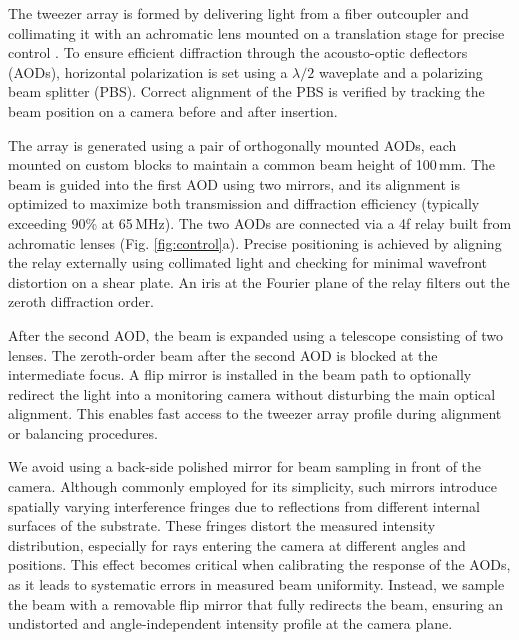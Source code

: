 The tweezer array is formed by delivering light from a fiber outcoupler and collimating it with an achromatic lens mounted on a translation stage for precise control \cite{culemann_construction_2024}. To ensure efficient diffraction through the acousto-optic deflectors (AODs), horizontal polarization is set using a $\lambda/2$ waveplate and a polarizing beam splitter (PBS). Correct alignment of the PBS is verified by tracking the beam position on a camera before and after insertion.

The array is generated using a pair of orthogonally mounted AODs, each mounted on custom blocks to maintain a common beam height of 100\,mm. The beam is guided into the first AOD using two mirrors, and its alignment is optimized to maximize both transmission and diffraction efficiency (typically exceeding 90\% at 65\,MHz). The two AODs are connected via a 4f relay built from achromatic lenses (Fig. \ref{fig:control}a). Precise positioning is achieved by aligning the relay externally using collimated light and checking for minimal wavefront distortion on a shear plate. An iris at the Fourier plane of the relay filters out the zeroth diffraction order.

After the second AOD, the beam is expanded using a telescope consisting of two lenses. 
The zeroth-order beam after the second AOD is blocked at the intermediate focus.
A flip mirror is installed in the beam path to optionally redirect the light into a monitoring camera without disturbing the main optical alignment. This enables fast access to the tweezer array profile during alignment or balancing procedures.

We avoid using a back-side polished mirror for beam sampling in front of the camera. Although commonly employed for its simplicity, such mirrors introduce spatially varying interference fringes due to reflections from different internal surfaces of the substrate. These fringes distort the measured intensity distribution, especially for rays entering the camera at different angles and positions. This effect becomes critical when calibrating the response of the AODs, as it leads to systematic errors in measured beam uniformity. Instead, we sample the beam with a removable flip mirror that fully redirects the beam, ensuring an undistorted and angle-independent intensity profile at the camera plane.




